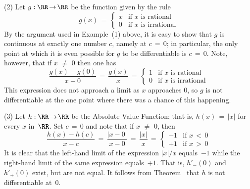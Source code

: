         (2) Let $g:{\RR} \,{\rightarrow}\, {\RR}$ be the function given by the rule
        \begin{displaymath}
        g(x) \,=\,
        \left\{
        \begin{array}{ll}
        x & \mbox{if $x$ is rational} \\
        0 & \mbox{if $x$ is irrational}
        \end{array}
        \right.
        \end{displaymath}
    By the argument used in Example~(1) above, it is easy to show that $g$ is continuous at exactly one number $c$, namely at $c \,=\, 0$;
    in particular, the only point at which it is even possible for $g$ to be differentiable is $c \,=\, 0$.
    Note, however, that if $x \,\,{\neq}\,\, 0$ then one has
        \begin{displaymath}
        \frac{g(x)-g(0)}{x-0} \,=\, \frac{g(x)}{x} \,=\, 
        \left\{
        \begin{array}{ll}
         1 & \mbox{if $x$ is rational} \\
         0    & \mbox{if $x$ is irrational}
        \end{array}
        \right.
        \end{displaymath}
    This expression does not approach a limit as $x$ approaches $0$, so $g$ is not differentiable at the one point where there was a chance of this happening.

\V

        (3) Let $h:{\RR} \,{\rightarrow}\, {\RR}$ be the Absolute-Value Function; that is, $h(x) \,=\, |x|$ for every $x$ in~${\RR}$.
    Set $c \,=\, 0$ and note that if $x \,\,{\neq}\,\, 0$, then
        \begin{displaymath}
        \frac{h(x) - h(c)}{x - c} \,=\, \frac{|x-0|}{x-0} \,=\, \frac{|x|}{x} 
    \,=\, 
        \left\{
        \begin{array}{rl}
        -1 & \mbox{if $x\,<\,0$} \\
        +1 & \mbox{if $x\,>\,0$}
        \end{array}
        \right.
        \end{displaymath}
    It is clear that the left-hand limit of the expression $|x|/x$ equals~$-1$ while the right-hand limit of the same expression equals~$+1$.
    That is, $h'_{-}(0)$ and $h'_{+}(0)$ exist, but are not equal. It follows from Theorem~ that $h$ is not differentiable at~$0$.



